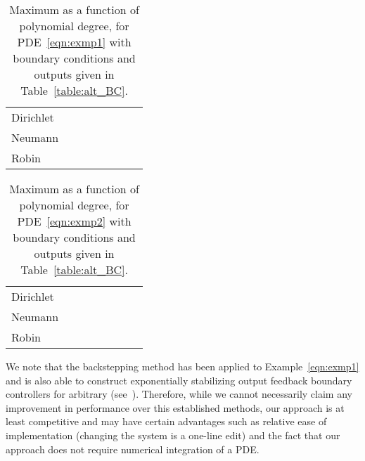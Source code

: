 \documentclass[US letter, 9 pt, conference]{ieeeconf}  \usepackage{setspace}
\begin{document}
\begin{table}{}
\caption{Maximum  as a function of polynomial degree,  for PDE~\eqref{eqn:exmp1} with boundary conditions and outputs given in Table~\ref{table:alt_BC}.}
\begin{center}
    \begin{tabular}{l *{7}{c}}\hline
  & &  &  &  &   \\ \hline
  Dirichlet &  &  &  &  &    \\
  Neumann &  &  &  &  &  \\
  Robin &  &  &  &  &  \\
\end{tabular}
\end{center}
\label{table:alt:cont1}
\end{table}

\begin{table}{}
\caption{Maximum  as a function of polynomial degree,  for PDE~\eqref{eqn:exmp2} with boundary conditions and outputs given in Table~\ref{table:alt_BC}.}
\begin{center}
    \begin{tabular}{l *{7}{c}}\hline
  & &  &  &  &   \\ \hline
  Dirichlet &  &  &  &  &    \\
  Neumann &  &  &  &  &  \\
  Robin &  &  &  &  &  \\
\end{tabular}
\end{center}
\label{table:alt:cont2}
\end{table}

We note that the backstepping method has been applied to Example~\eqref{eqn:exmp1} and is also able to construct exponentially stabilizing output feedback boundary controllers for arbitrary  (see~\cite{krstic2008adaptive}). Therefore, while we cannot necessarily claim any improvement in performance over this established methods, our approach is at least competitive and may have certain advantages such as relative ease of implementation (changing the system is a one-line edit) and the fact that our approach does not require numerical integration of a PDE.
\end{document}
